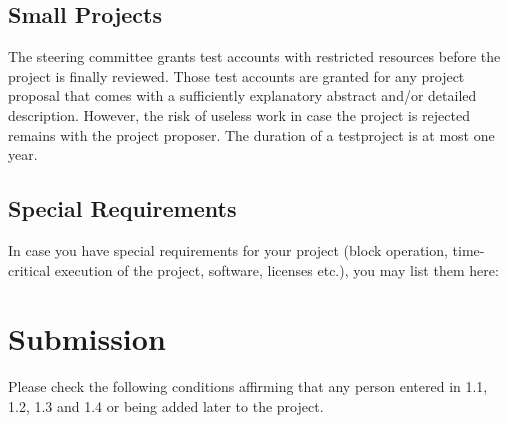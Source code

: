 \documentclass[accentcolor=tud9c,nochapname,11pt]{tudexercise}
\makeatletter
\newcommand\saferead[1]{%
  \bgroup
  \let\do\@makeother
  \dospecials\catcode`\ 10
  \egroup 
}
\makeatother
\begin{document}
\begin{Form}
\subsection{Small Projects}
The steering committee grants test accounts with restricted resources before the project is finally reviewed. Those test accounts are granted for any project proposal that comes with a sufficiently explanatory abstract and/or detailed description.
However, the risk of useless work in case the project is rejected remains with the project proposer.
The duration of a testproject is at most one year. \\
\subsection{Special Requirements}
In case you have special requirements for your project (block operation, time-critical execution of the project, software, licenses etc.), you may list them here: \\
\fbox{
	\begin{minipage}{6.5in}
		 \vspace{0.1in} \\
		 \saferead{spl_req.txt}
	\end{minipage}
	} 
\section{Submission}
Please check the following conditions affirming that any person entered in 1.1, 1.2, 1.3 and 1.4 or being added later to the project.\\
\begin{tabbing}


\end{tabbing}
\end{Form}
\end{document}
